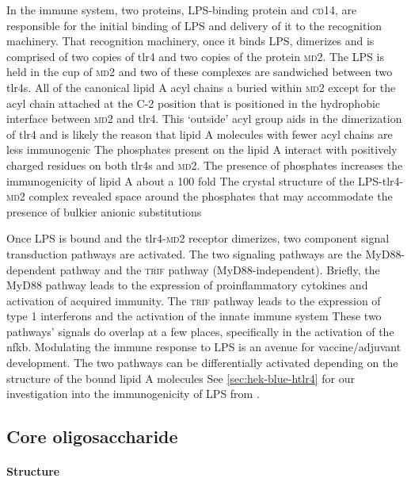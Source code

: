 In the immune system, two proteins, \ac{LPS}-binding protein and \textsc{cd}14,
are responsible for the initial binding of  \ac{LPS} and delivery of it to the recognition machinery.
That recognition machinery, once it binds \ac{LPS}, dimerizes and is comprised
of two copies of \ac{tlr4} and two copies of the protein \textsc{md}2. The \ac{LPS} is held in the cup of
\textsc{md}2 and two of these complexes are sandwiched between two \acp{tlr4}. All of the canonical lipid A acyl chains a buried within \textsc{md}2 except for the acyl chain attached
at the C-2 position that is positioned in the hydrophobic interface between \textsc{md}2 and \ac{tlr4}. This `outside' acyl group aids in the dimerization of \ac{tlr4} and is likely
the reason that lipid A molecules with fewer acyl chains are less immunogenic The phosphates present on the lipid A interact with positively
charged residues on both \acp{tlr4} and \textsc{md}2. The presence of phosphates increases the immunogenicity of lipid A about a 100 fold The
crystal structure of the \ac{LPS}-\ac{tlr4}-\textsc{md}2 complex revealed space around the phosphates that may accommodate the presence of bulkier anionic
substitutions

Once \ac{LPS} is bound and the \ac{tlr4}-\textsc{md}2 receptor dimerizes, two component signal transduction pathways are activated. The two signaling pathways are the
MyD88-dependent pathway and the \textsc{trif} pathway (MyD88-independent).
Briefly, the MyD88 pathway leads to the expression of proinflammatory cytokines
and activation of acquired immunity. The \textsc{trif}
pathway leads to the expression of type 1 interferons and the activation of the innate immune system These two pathways' signals do overlap at a few places,
specifically in the activation of the \ac{nfkb}. Modulating the immune response to \ac{LPS} is an avenue for vaccine/adjuvant development. The two pathways can be differentially
activated depending on the structure of the bound lipid A molecules See \cref{sec:hek-blue-htlr4} for our investigation into the immunogenicity of
\ac{LPS} from \caulobacter.

  \subsection{Core oligosaccharide}\label{sec:core-oligosaccharide-intro}
  
    \paragraph{Structure}

